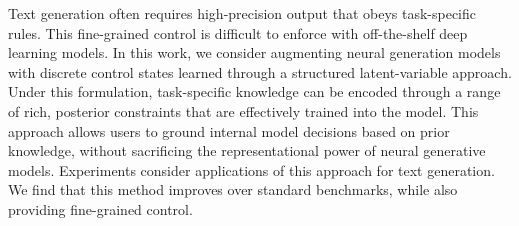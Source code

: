 Text generation often requires high-precision output that obeys task-specific rules. This fine-grained control is difficult to enforce with off-the-shelf deep learning models. In this work, we consider augmenting neural generation models with discrete control states learned through a structured latent-variable approach. Under this formulation, task-specific knowledge can be encoded through a range of rich, posterior constraints that are effectively trained into the model. This approach allows users to ground internal model decisions based on prior knowledge, without sacrificing the representational power of neural generative models. Experiments consider applications of this approach for text generation. We find that this method improves over standard benchmarks, while also providing fine-grained control.
